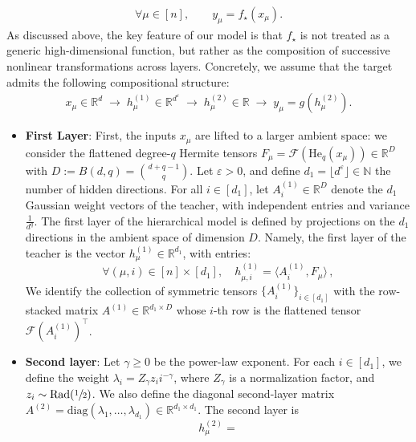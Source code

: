 \documentclass[]{article}
\numberwithin{equation}{section}
\theoremstyle{definition}
\newcommand{\RR}{\mathbb{R}}
\newcommand{\NN}{\mathbb{N}}
\newcommand{\He}{\mathord{\mathrm{He}}}
\begin{document}
\begin{align}
\forall \mu \in [n], \qquad y_\mu = f_{\star}(x_\mu).
\end{align}
As discussed above, the key feature of our model is that $f_{\star}$ is not treated as a generic high-dimensional function, but rather as the composition of successive nonlinear transformations across layers. Concretely, we assume that the target admits the following compositional structure:
\begin{align}
\label{eq:def:target}
x_\mu \in \mathbb{R}^d 
\;\longrightarrow\; h^{(1)}_\mu \in \mathbb{R}^{d^\varepsilon}
\;\longrightarrow\; h^{(2)}_\mu \in \mathbb{R}
\;\longrightarrow\; y_\mu = g(h^{(2)}_\mu).
\end{align}
\begin{itemize}[noitemsep,leftmargin=1em]
    \item \textbf{First Layer}: First, the inputs $x_\mu$ are lifted to a larger ambient space: we consider the flattened degree-$q$ Hermite tensors $F_\mu = \mathcal{F}(\He_q(x_\mu))\in \RR^{D}$ with $D:=B(d,q) = \binom{d+ q-1}{q}$. Let $\varepsilon >0$, and define $d_1 = \lfloor d^{\varepsilon} \rfloor \in \NN$ the number of hidden directions. For all $i \in [d_1]$, let $A^{(1)}_{i} \in \RR^{D}$ denote the $d_1$ Gaussian weight vectors of the teacher, with independent entries and variance $\frac{1}{d^{q}}$. The first layer of the hierarchical model is defined by projections on the $d_1$ directions in the ambient space of dimension $D$. Namely, the first layer of the teacher is the vector $h^{(1)}_{\mu} \in \RR^{d_1}$, with entries: 
    \begin{equation}
       \forall (\mu, i) \in [n]\times [d_1] ,\quad h^{(1)}_{\mu,i} = \langle A^{(1)}_{i}, F_\mu \rangle \, , 
    \end{equation} 
    We identify the collection of symmetric tensors $\{A_i^{(1)}\}_{i\in[d_1]}$ with the row-stacked matrix $A^{(1)}\in\RR^{d_1\times D}$ whose $i$-th row is the flattened tensor $\mathcal F(A_i^{(1)})^\top$.
    \item \textbf{Second layer}: Let $\gamma \geq 0$ be the power-law exponent. For each $i \in [d_1]$, we define the weight $\lambda_i = Z_{\gamma} z_i i^{-\gamma}$, where $Z_{\gamma}$ is a normalization factor, and $z_i \sim \mathrm{Rad}(\sfrac{1}{2})$. We also define the diagonal second-layer matrix $A^{(2)}=\mathrm{diag}(\lambda_1,\ldots,\lambda_{d_1})\in\RR^{d_1\times d_1}$. The second layer is
    \begin{equation}
        h_\mu^{(2)}
        =

\end{equation}
\end{itemize}
\end{document}
